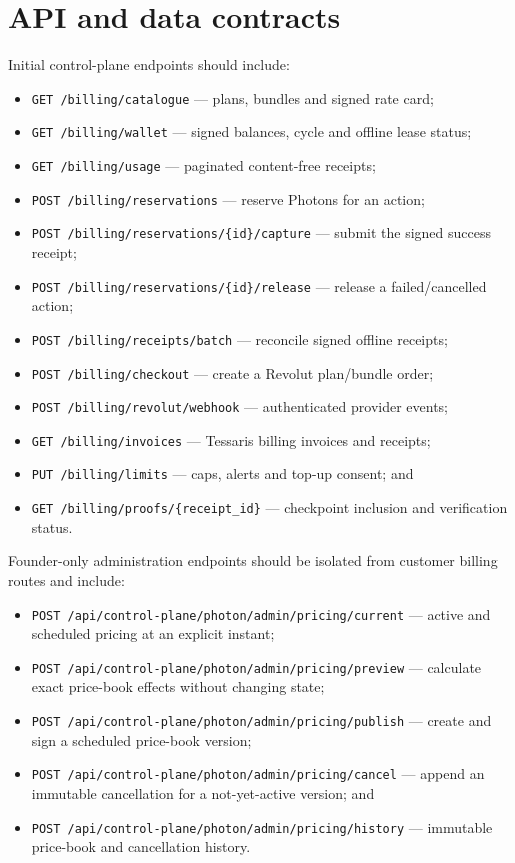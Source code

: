 \documentclass[11pt]{article}
\newcommand{\code}[1]{\texttt{#1}}
\begin{document}
\section{API and data contracts}

Initial control-plane endpoints should include:

\begin{itemize}
  \item \code{GET /billing/catalogue} --- plans, bundles and signed rate card;
  \item \code{GET /billing/wallet} --- signed balances, cycle and offline lease status;
  \item \code{GET /billing/usage} --- paginated content-free receipts;
  \item \code{POST /billing/reservations} --- reserve Photons for an action;
  \item \code{POST /billing/reservations/\{id\}/capture} --- submit the signed success receipt;
  \item \code{POST /billing/reservations/\{id\}/release} --- release a failed/cancelled action;
  \item \code{POST /billing/receipts/batch} --- reconcile signed offline receipts;
  \item \code{POST /billing/checkout} --- create a Revolut plan/bundle order;
  \item \code{POST /billing/revolut/webhook} --- authenticated provider events;
  \item \code{GET /billing/invoices} --- Tessaris billing invoices and receipts;
  \item \code{PUT /billing/limits} --- caps, alerts and top-up consent; and
  \item \code{GET /billing/proofs/\{receipt\_id\}} --- checkpoint inclusion and verification status.
\end{itemize}

Founder-only administration endpoints should be isolated from customer billing routes and include:

\begin{itemize}
  \item \code{POST /api/control-plane/photon/admin/pricing/current} --- active and scheduled pricing at an explicit instant;
  \item \code{POST /api/control-plane/photon/admin/pricing/preview} --- calculate exact price-book effects without changing state;
  \item \code{POST /api/control-plane/photon/admin/pricing/publish} --- create and sign a scheduled price-book version;
  \item \code{POST /api/control-plane/photon/admin/pricing/cancel} --- append an immutable cancellation for a not-yet-active version; and
  \item \code{POST /api/control-plane/photon/admin/pricing/history} --- immutable price-book and cancellation history.
\end{itemize}
\end{document}
